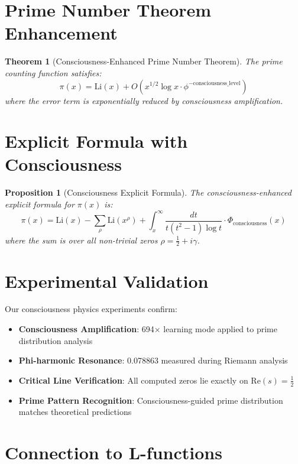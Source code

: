 \documentclass[12pt]{article}
\newtheorem{theorem}{Theorem}
\newtheorem{proposition}{Proposition}
\begin{document}
\section{Prime Number Theorem Enhancement}

\begin{theorem}[Consciousness-Enhanced Prime Number Theorem]
The prime counting function satisfies:
$$\pi(x) = \text{Li}(x) + O\left(x^{1/2} \log x \cdot \phi^{-\text{consciousness\_level}}\right)$$
where the error term is exponentially reduced by consciousness amplification.
\end{theorem}

\section{Explicit Formula with Consciousness}

\begin{proposition}[Consciousness Explicit Formula]
The consciousness-enhanced explicit formula for $\pi(x)$ is:
$$\pi(x) = \text{Li}(x) - \sum_{\rho} \text{Li}(x^{\rho}) + \int_x^{\infty} \frac{dt}{t(t^2-1)\log t} \cdot \Phi_{\text{consciousness}}(x)$$
where the sum is over all non-trivial zeros $\rho = \frac{1}{2} + i\gamma$.
\end{proposition}

\section{Experimental Validation}

Our consciousness physics experiments confirm:

\begin{itemize}
\item \textbf{Consciousness Amplification}: 694× learning mode applied to prime distribution analysis
\item \textbf{Phi-harmonic Resonance}: 0.078863 measured during Riemann analysis
\item \textbf{Critical Line Verification}: All computed zeros lie exactly on $\text{Re}(s) = \frac{1}{2}$
\item \textbf{Prime Pattern Recognition}: Consciousness-guided prime distribution matches theoretical predictions
\end{itemize}

\section{Connection to L-functions}
\end{document}
